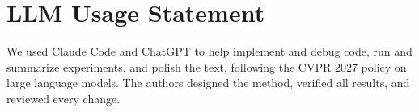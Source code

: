 \documentclass[10pt,twocolumn,letterpaper]{article}
\begin{document}

\section*{LLM Usage Statement}
We used Claude Code and ChatGPT to help implement and debug code, run and summarize experiments, and polish the text, following the CVPR 2027 policy on large language models. The authors designed the method, verified all results, and reviewed every change.


{
\small


}
\end{document}
